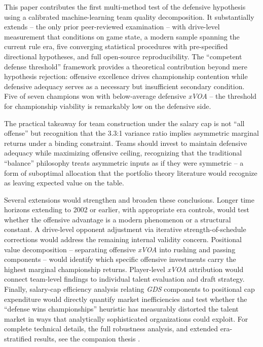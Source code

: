 \documentclass[12pt,a4paper]{article}
\newcommand{\xvoa}{\textit{xVOA}}
\newcommand{\gds}{\textit{GDS}}
\begin{document}
This paper contributes the first multi-method test of the defensive hypothesis using a calibrated machine-learning team quality decomposition. It substantially extends \citet{robst2011defense} -- the only prior peer-reviewed examination -- with drive-level measurement that conditions on game state, a modern sample spanning the current rule era, five converging statistical procedures with pre-specified directional hypotheses, and full open-source reproducibility. The ``competent defense threshold'' framework provides a theoretical contribution beyond mere hypothesis rejection: offensive excellence drives championship contention while defensive adequacy serves as a necessary but insufficient secondary condition. Five of seven champions won with below-average defensive \xvoa{} -- the threshold for championship viability is remarkably low on the defensive side.

The practical takeaway for team construction under the salary cap is not ``all offense'' but recognition that the 3.3:1 variance ratio implies asymmetric marginal returns under a binding constraint. Teams should invest to maintain defensive adequacy while maximizing offensive ceiling, recognizing that the traditional ``balance'' philosophy treats asymmetric inputs as if they were symmetric -- a form of suboptimal allocation that the portfolio theory literature would recognize as leaving expected value on the table.

Several extensions would strengthen and broaden these conclusions. Longer time horizons extending to 2002 or earlier, with appropriate era controls, would test whether the offensive advantage is a modern phenomenon or a structural constant. A drive-level opponent adjustment via iterative strength-of-schedule corrections would address the remaining internal validity concern. Positional value decomposition -- separating offensive \xvoa{} into rushing and passing components -- would identify which specific offensive investments carry the highest marginal championship returns. Player-level \xvoa{} attribution would connect team-level findings to individual talent evaluation and draft strategy. Finally, salary-cap efficiency analysis relating \gds{} components to positional cap expenditure would directly quantify market inefficiencies and test whether the ``defense wins championships'' heuristic has measurably distorted the talent market in ways that analytically sophisticated organizations could exploit. For complete technical details, the full robustness analysis, and extended era-stratified results, see the companion thesis \citep{mecha2026xscore}.
\end{document}
